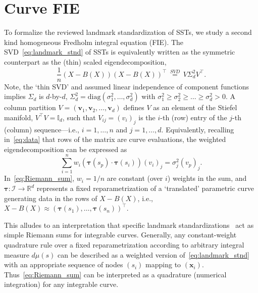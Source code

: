 \documentclass[pdflatex,iicol]{sn-jnl}%
\theoremstyle{thmstyleone}%
\theoremstyle{thmstyletwo}%
\theoremstyle{thmstylethree}%
\begin{document}

\section{Curve FIE} \label{sec:FIE}
To formalize the reviewed landmark standardization of SSTs, we study a second kind homogeneous Fredholm integral equation (FIE). The SVD~\eqref{eq:landmark_stnd} of SSTs is equivalently written as the symmetric counterpart as the (thin) scaled eigendecomposition, 
\begin{equation}
    \frac{1}{n}(X - B(X))(X - B(X))^{\top} \,\overset{SVD}{=}\, V\Sigma^2_d V^{\top}.
\end{equation}
Note, the `thin SVD' and assumed linear independence of component functions implies $\Sigma_d$ is $d$-by-$d$, $\Sigma^2_d = \text{diag}(\sigma^2_1,\dots, \sigma^2_d)$ with $\sigma_1^2 \geq \sigma_2^2 \geq \dots \geq \sigma_d^2 > 0$. A column partition $V = (\mathbf{v}_1, \mathbf{v}_2, \dots, \mathbf{v}_d)$ defines $V$ as an element of the Stiefel manifold, $V^{\top}V = \mathbb{I}_d$, such that $V_{ij} = (v_i)_j$ is the $i$-th (row) entry of the $j$-th (column) sequence---i.e., $i=1,\dots,n$ and $j=1,\dots,d$. Equivalently, recalling in~\eqref{eq:data} that rows of the matrix are curve evaluations, the weighted eigendecomposition can be expressed as
\begin{equation} \label{eq:Riemann_sum}
    \sum_{i=1}^{n}w_i ( \boldsymbol{\tau}(s_p) \cdot \boldsymbol{\tau}(s_i) ) (v_i)_j = \sigma^2_j(v_p)_j.
\end{equation}    
In~\eqref{eq:Riemann_sum}, $w_i = 1/n$ are constant (over $i$) weights in the sum, and $\boldsymbol{\tau}:\mathcal{I} \rightarrow \mathbb{R}^d$ represents a fixed reparametrization of a `translated' parametric curve generating data in the rows of $X-B(X)$, i.e., $X-B(X) \approx (\boldsymbol{\tau}(s_1),\dots, \boldsymbol{\tau}(s_n))^{\top}$.

This alludes to an interpretation that specific landmark standardizations~\cite{bryner20142d, grey2023separable} act as simple Riemann sums for integrable curves. Generally, any constant-weight quadrature rule over a fixed reparametrization according to arbitrary integral measure $d\mu(s)$ can be described as a weighted version of~\eqref{eq:landmark_stnd} with an appropriate sequence of nodes $(s_i)$ mapping to $(\boldsymbol{x}_i)$. Thus~\eqref{eq:Riemann_sum} can be interpreted as a quadrature (numerical integration) for any integrable curve.
\end{document}

